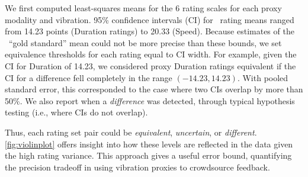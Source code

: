 %
%
% 
We first computed least-squares means for the 6 rating scales
for each proxy modality and vibration.
95\% confidence intervals (CI) for \hifi~rating means ranged from 14.23 points (Duration ratings) to 20.33 (Speed).
Because estimates of the \hifi~``gold standard'' mean could not be more precise than these bounds, we set equivalence thresholds for each rating equal to CI width.
For example, given the CI for Duration of 14.23, we considered proxy Duration ratings equivalent if the CI for a difference fell completely in the range $(-14.23, 14.23)$.
With pooled standard error, this corresponded to the case where two CIs overlap by more than 50\%.
%
We also report when a \textit{difference} was detected, through typical hypothesis testing (i.e., where CIs do not overlap).

Thus, each rating set pair could be \textit{equivalent}, \textit{uncertain}, or \textit{different}.
\autoref{fig:violinplot} offers insight into how these  levels are reflected in the data given the high rating variance.
This approach gives a useful error bound, quantifying the precision tradeoff in using vibration proxies  to crowdsource feedback.




